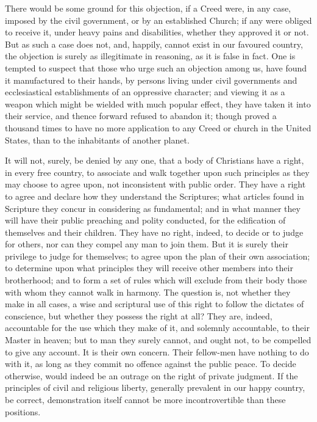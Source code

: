 \documentclass[
]{book}
\begin{document}
There would be some ground for this objection, if a Creed were, in any case, imposed by the civil government, or by an established Church; if any were obliged to receive it, under heavy pains and disabilities, whether they approved it or not. But as such a case does not, and, happily, cannot exist in our favoured country, the objection is surely as illegitimate in reasoning, as it is false in fact. One is tempted to suspect that those who urge such an objection among us, have found it manufactured to their hands, by persons living under civil governments and ecclesiastical establishments of an oppressive character; and viewing it as a weapon which might be wielded with much popular effect, they have taken it into their service, and thence forward refused to abandon it; though proved a thousand times to have no more application to any Creed or church in the United States, than to the inhabitants of another planet.

It will not, surely, be denied by any one, that a body of Christians have a right, in every free country, to associate and walk together upon such principles as they may choose to agree upon, not inconsistent with public order. They have a right to agree and declare how they understand the Scriptures; what articles found in Scripture they concur in considering as fundamental; and in what manner they will have their public preaching and polity conducted, for the edification of themselves and their children. They have no right, indeed, to decide or to judge for others, nor can they compel any man to join them. But it is surely their privilege to judge for themselves; to agree upon the plan of their own association; to determine upon what principles they will receive other members into their brotherhood; and to form a set of rules which will exclude from their body those with whom they cannot walk in harmony. The question is, not whether they make in all cases, a wise and scriptural use of this right to follow the dictates of conscience, but whether they possess the right at all? They are, indeed, accountable for the use which they make of it, and solemnly accountable, to their Master in heaven; but to man they surely cannot, and ought not, to be compelled to give any account. It is their own concern. Their fellow-men have nothing to do with it, as long as they commit no offence against the public peace. To decide otherwise, would indeed be an outrage on the right of private judgment. If the principles of civil and religious liberty, generally prevalent in our happy country, be correct, demonstration itself cannot be more incontrovertible than these positions.
\end{document}
